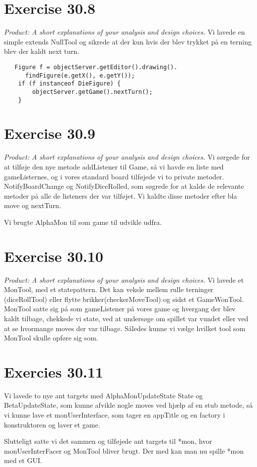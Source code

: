 \documentclass[a4paper]{article}
\begin{document}
\lhead{}
\rhead{}


\section*{Exercise 30.8}
\textit{Product: A short explanations of your analysis and design choices.}
Vi lavede en simple extends NullTool og sikrede at der kun hvis der
blev trykket på en terning blev der kaldt next turn.
\begin{verbatim}
   Figure f = objectServer.getEditor().drawing().
      findFigure(e.getX(), e.getY());
    if (f instanceof DieFigure) {
    	objectServer.getGame().nextTurn();
    } 
\end{verbatim}


\section*{Exercise 30.9}
\textit{Product: A short explanations of your analysis and design choices.}
Vi sørgede for at tilføje den nye metode addListener til Game, så vi
havde en liste med gameListernes, og i vores standard board tilføjede vi
to private metoder. NotifyBoardChange og NotifyDiceRolled, som
søgrede for at kalde de relevante metoder på alle de listeners der var
tilføjet. Vi kaldte disse metoder efter bla move og nextTurn.

Vi brugte AlphaMon til som game til udvikle udfra.


\section*{Exercise 30.10}
\textit{Product: A short explanations of your analysis and design choices.}
Vi lavede et MonTool, med et statepattern. Det kan veksle mellem rulle
terninger (diceRollTool) eller flytte brikker(checkerMoveTool) og
sidst et GameWonTool. MonTool satte sig på som gameListener på vores
game og hvergang der blev kaldt tilbage, chekkede vi state, ved at
undersøge om spillet var vundet eller ved at se hvormange moves der
var tilbage. Således kunne vi vælge hvilket tool som MonTool skulle
opføre sig som.



\section*{Exercies 30.11}
Vi lavede to nye ant targets med AlphaMonUpdateState State og
BetaUpdateState, som kunne afvikle nogle moves ved hjælp af en stub
metode, så vi kunne lave et monUserInterface, som tager en appTitle og
en factory i konstruktoren og laver et game.

Slutteligt satte vi det sammen og tilføjede ant targets til *mon, hvor
monUserInterFacer og MonTool bliver brugt. Der med kan man nu spille
*mon med et GUI.
\end{document}
